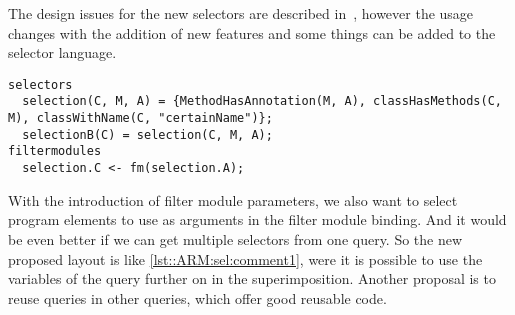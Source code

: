 The design issues for the new selectors are described in~\cite{Havinga2005}, however the usage changes with the addition of new features and some things can be added to the selector language.

\begin{lstlisting}[caption={A selector with extended syntax}, label = lst::ARM:sel:comment1, style=listing, language =ComposeStar, float = tpb]
selectors
  selection(C, M, A) = {MethodHasAnnotation(M, A), classHasMethods(C, M), classWithName(C, "certainName")};
  selectionB(C) = selection(C, M, A);
filtermodules
  selection.C <- fm(selection.A);
\end{lstlisting}
With the introduction of filter module parameters, we also want to select program elements to use as arguments in the filter module binding. 
And it would be even better if we can get multiple selectors from one query. So the new proposed layout is like \autoref{lst::ARM:sel:comment1}, were it is possible to use the variables of the query further on in the superimposition. 
Another proposal is to reuse queries in other queries, which offer good reusable code.
